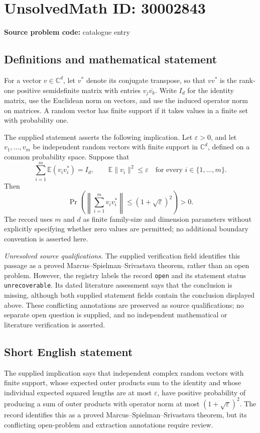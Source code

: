\documentclass[11pt]{article}
\newcommand{\C}{\mathbb{C}}
\newcommand{\E}{\mathbb{E}}
\begin{document}
\section*{UnsolvedMath ID: 30002843}
\textbf{Source problem code:} catalogue entry
\subsection{Definitions and mathematical statement}
For a vector \(v\in\C^d\), let \(v^*\) denote its conjugate transpose, so that \(vv^*\) is the rank-one positive semidefinite matrix with entries \(v_j\overline{v_k}\). Write \(I_d\) for the identity matrix, use the Euclidean norm on vectors, and use the induced operator norm on matrices. A random vector has finite support if it takes values in a finite set with probability one.

The supplied statement asserts the following implication. Let \(\varepsilon>0\), and let \(v_1,\ldots,v_m\) be independent random vectors with finite support in \(\C^d\), defined on a common probability space. Suppose that
\[
\sum_{i=1}^{m}\E(v_i v_i^*)=I_d,
\qquad
\E\|v_i\|^2\leq\varepsilon
\quad\text{for every }i\in\{1,\ldots,m\}.
\]
Then
\[
\Pr\!\left(
\left\|\sum_{i=1}^{m}v_i v_i^*\right\|
\leq(1+\sqrt{\varepsilon})^2
\right)>0.
\]
The record uses \(m\) and \(d\) as finite family-size and dimension parameters without explicitly specifying whether zero values are permitted; no additional boundary convention is asserted here.

\textit{Unresolved source qualifications.} The supplied verification field identifies this passage as a proved Marcus--Spielman--Srivastava theorem, rather than an open problem. However, the registry labels the record \texttt{open} and its statement status \texttt{unrecoverable}. Its dated literature assessment says that the conclusion is missing, although both supplied statement fields contain the conclusion displayed above. These conflicting annotations are preserved as source qualifications; no separate open question is supplied, and no independent mathematical or literature verification is asserted.
\subsection{Short English statement}
The supplied implication says that independent complex random vectors with finite support, whose expected outer products sum to the identity and whose individual expected squared lengths are at most \(\varepsilon\), have positive probability of producing a sum of outer products with operator norm at most \((1+\sqrt{\varepsilon})^2\). The record identifies this as a proved Marcus--Spielman--Srivastava theorem, but its conflicting open-problem and extraction annotations require review.
\end{document}
